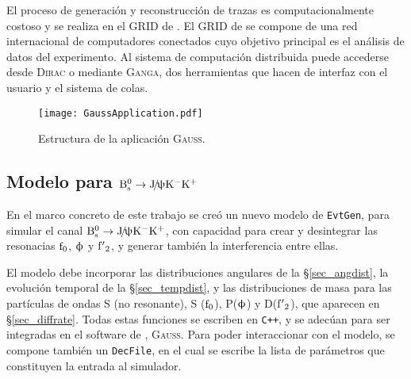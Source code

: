 El proceso de generación y reconstrucción de trazas es computacionalmente costoso y se realiza en el GRID de \lhcb. 
El GRID de \lhcb se compone de una red internacional de computadores conectados cuyo objetivo principal es el análisis de datos del experimento. Al sistema de computación distribuida puede accederse desde \textsc{Dirac} o mediante \textsc{Ganga}, dos herramientas que hacen de interfaz con el usuario y el sistema de colas.





\begin{figure}[H]
\centering
\texttt{[image: GaussApplication.pdf]}
\caption{Estructura de la aplicación  \textsc{Gauss}.}	 \label{fig_gaussapp}
\end{figure}




\subsection{Modelo para $\mathrm{B}{}_{\mathrm{s}}^{0} \rightarrow \mathrm{J}\!/\!\uppsi \mathrm{K}{}^{-} \mathrm{K}{}^{+}$} %
\label{sec:Bs2JpsiKKmodel}

En el marco concreto de este trabajo se creó un nuevo modelo de \texttt{EvtGen}, para simular el canal $\mathrm{B}{}_{\mathrm{s}}^{0} \rightarrow \mathrm{J}\!/\!\uppsi \mathrm{K}{}^{-} \mathrm{K}{}^{+}$, con capacidad para crear y desintegrar las resonacias $\mathrm{f}_0$, $\upphi$ y $\mathrm{f'}_2$, y \color{vero} generar también la interferencia entre ellas. \color{norm} 

El modelo debe incorporar las distribuciones angulares de la \S \ref{sec_angdist}, la evolución temporal de la \S \ref{sec_tempdist}, y las distribuciones de masa para las partículas de ondas S (no resonante), S ($\mathrm{f}_0$), P($\upphi$) y D($\mathrm{f'}_2$), que aparecen en \S \ref{sec_diffrate}.  Todas estas funciones se escriben en \texttt{C++}, y se adecúan para ser integradas en el software de \lhcb, \textsc{Gauss}. Para poder interaccionar con el modelo, se compone también un \texttt{DecFile}, en el cual se escribe la lista de parámetros que constituyen la entrada al simulador.


